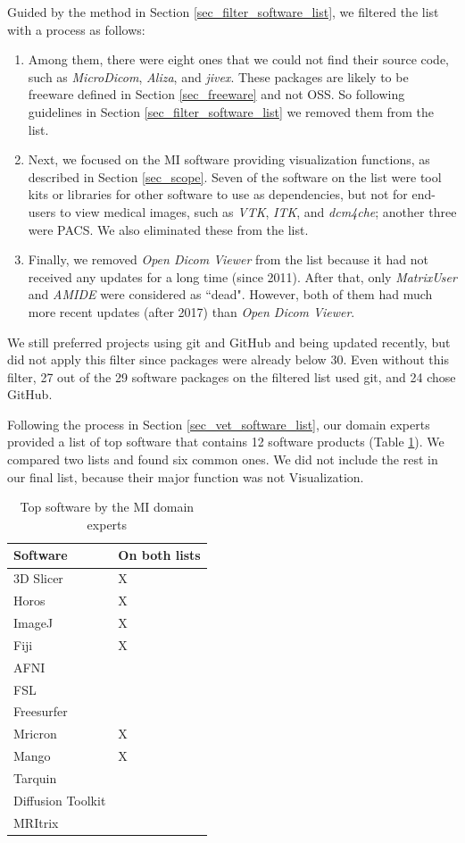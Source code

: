 Guided by the method in Section \ref{sec_filter_software_list}, we filtered the list with a process as follows:

\begin{enumerate}
\item Among them, there were eight ones that we could not find their source code, such as \textit{MicroDicom}, \textit{Aliza}, and \textit{jivex}. These packages are likely to be freeware defined in Section \ref{sec_freeware} and not OSS. So following guidelines in Section \ref{sec_filter_software_list} we removed them from the list.

\item Next, we focused on the MI software providing visualization functions, as described in Section \ref{sec_scope}. Seven of the software on the list were tool kits or libraries for other software to use as dependencies, but not for end-users to view medical images, such as \textit{VTK}, \textit{ITK}, and \textit{dcm4che}; another three were PACS. We also eliminated these from the list.

\item Finally, we removed \textit{Open Dicom Viewer} from the list because it had not received any updates for a long time (since 2011). After that, only \textit{MatrixUser} and \textit{AMIDE} were considered as ``dead". However, both of them had much more recent updates (after 2017) than \textit{Open Dicom Viewer}.
\end{enumerate}

We still preferred projects using git and GitHub and being updated recently, but did not apply this filter since packages were already below 30. Even without this filter, 27 out of the 29 software packages on the filtered list used git, and 24 chose GitHub.

Following the process in Section \ref{sec_vet_software_list}, our domain experts provided a list of top software that contains 12 software products (Table \ref{tab_top_software_experts}). We compared two lists and found six common ones. We did not include the rest in our final list, because their major function was not Visualization.

\begin{table}[H]
\centering
\begin{tabular}{ll}
\hline
Software & On both lists \\ \hline
3D Slicer & X \\
Horos & X \\
ImageJ & X \\
Fiji & X \\
AFNI &  \\
FSL &  \\
Freesurfer &  \\
Mricron & X \\
Mango & X \\
Tarquin &  \\
Diffusion Toolkit &  \\
MRItrix &  \\ \hline
\end{tabular}
\caption{\label{tab_top_software_experts}Top software by the MI domain experts}
\end{table}

